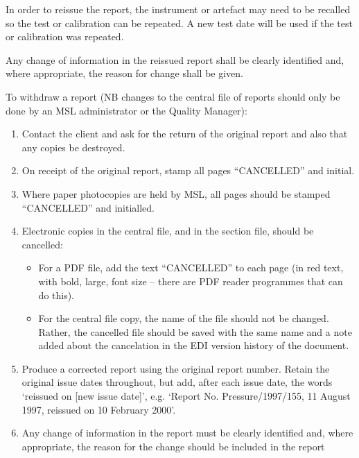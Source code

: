 In order to reissue the report, the instrument or artefact may need to be recalled so the test or calibration can be repeated. A new test date will be used if the test or calibration was repeated.

Any change of information in the reissued report shall be clearly identified and, where appropriate, the reason for change shall be given.

To withdraw a report (NB changes to the central file of reports should only be done by an MSL administrator or the Quality Manager):
\begin{enumerate}
\item Contact the client and ask for the return of the original report and also that any copies be destroyed. 

\item On receipt of the original report, stamp all pages ``{\color{red}CANCELLED}” and initial. 

\item Where paper photocopies are held by MSL, all pages should be stamped ``{\color{red}CANCELLED}” and initialled.

\item Electronic copies in the central file, and in the section file, should be cancelled:
\begin{itemize}
\item For a PDF file, add the text “{\color{red}CANCELLED}” to each page (in red text, with bold, large, font size – there are PDF reader programmes that can do this). 
\item For the central file copy, the name of the file should not be changed. Rather, the cancelled file should be saved with the same name and a note added about the cancelation in the EDI version history of the document. 
\end{itemize}

\item Produce a corrected report using the original report number.  Retain the original issue dates throughout, but add, after each issue date, the words ‘reissued on [new issue date]’, e.g. ‘Report No. Pressure/1997/155, 11 August 1997, reissued on 10 February 2000’.

\item Any change of information in the report must be clearly identified and, where appropriate, the reason for the change should be included in the report 


\end{enumerate}
